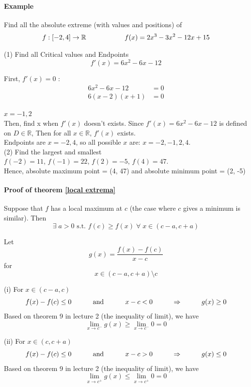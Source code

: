 \documentclass[12pt]{article}
\newcommand\tab[1][1cm]{\hspace*{#1}}
\begin{document}
\paragraph{Example} Find all the absolute extreme (with values and positions) of
\[
    f : [ -2,4] \to \mathbb{R} \textrm{\tab \tab} f(x) = 2x^3 - 3x^2 - 12x + 15
\]

\noindent
(1) Find all Critical values and Endpoints
\[
    f'(x) = 6x^2 - 6x - 12
\]


First, $f'(x) = 0$ :
\begin{align*} 
    6x^2 - 6x - 12 &= 0 \\
    6(x - 2)(x + 1) &= 0
\end{align*}

$x = {-1, 2}$ \\

Then, find x when $f'(x)$ doesn't exists. Since $f'(x) = 6x^2 - 6x - 12$ is defined on $D \in \mathbb{R}$, Then
for all $x \in \mathbb{R}$,  $f'(x)$ exists. \\

Endpoints are $x = {-2, 4}$, so all possible $x$ are: $x = {-2, -1, 2, 4}$. \\

\noindent
(2) Find the largest and smallest \\
$f(-2) = 11$, $f(-1) = 22$, $f(2) = -5$, $f(4) = 47$.\\
Hence, absolute maximum point = (4, 47) and absolute minimum point = (2, -5) 

\paragraph{Proof of theorem \ref{local extrema}}
Suppose that $f$ has a local maximum at $c$ (the case where  $c$ gives a minimum is  similar).
Then 
\[ 
    \exists \; a > 0\textrm{ s.t. } f(c) \geq f(x) \;  \forall \; x \in (c - a, c + a)
\]

\noindent
Let
\[
    g(x) = \frac{f(x) - f(c)}{x - c} 
\]
for 
\[
    x \in (c - a, c + a) \setminus {c} 
\]

(i) For $x \in (c - a, c)$ 
\[
    f(x) - f(c) \leq 0 \textrm{ \tab and \tab} x - c < 0 \textrm{\tab} \Rightarrow \textrm{\tab} g(x) \geq 0
\]
Based on theorem 9 in lecture 2 (the inequality of limit), we have
\[
    \lim_{x \to c^{ -}} g(x) \geq \lim_{x \to c^{ - }} 0 = 0
\]

(ii) For $x \in (c, c + a)$ 
\[
    f(x) - f(c) \leq  0 \textrm{ \tab and \tab} x - c > 0 \textrm{\tab} \Rightarrow \textrm{\tab} g(x) \leq  0
\]
Based on theorem 9 in lecture 2 (the inequality of limit), we have
\[
    \lim_{x \to c^{ + }} g(x) \leq  \lim_{x \to c^{ + }} 0 = 0
\]
\end{document}
